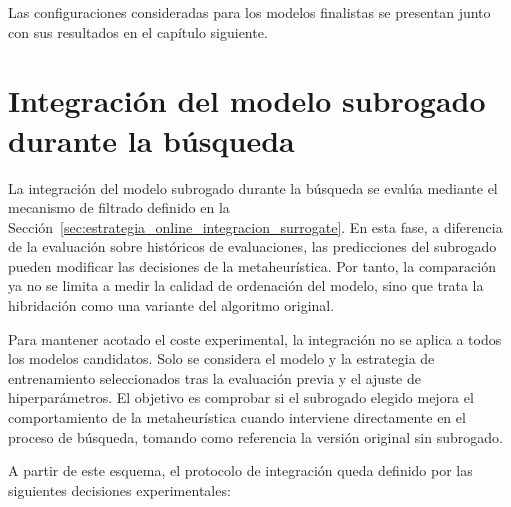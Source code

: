 Las configuraciones consideradas para los modelos finalistas se presentan junto con
sus resultados en el capítulo siguiente.

\section{Integración del modelo subrogado durante la búsqueda}
\label{sec:integracion_subrogado_busqueda}

La integración del modelo subrogado durante la búsqueda se evalúa mediante el mecanismo de filtrado definido en la Sección~\ref{sec:estrategia_online_integracion_surrogate}. En esta fase, a diferencia de la evaluación sobre históricos de evaluaciones, las predicciones del subrogado pueden modificar las decisiones de la metaheurística. Por tanto, la comparación ya no se limita a medir la calidad de ordenación del modelo, sino que trata la hibridación como una variante del algoritmo original.

Para mantener acotado el coste experimental, la integración no se aplica a todos los modelos candidatos. Solo se considera el modelo y la estrategia de entrenamiento seleccionados tras la evaluación previa y el ajuste de hiperparámetros. El objetivo es comprobar si el subrogado elegido mejora el comportamiento de la metaheurística cuando interviene directamente en el proceso de búsqueda, tomando como referencia la versión original sin subrogado.

A partir de este esquema, el protocolo de integración queda definido por las siguientes decisiones experimentales:

